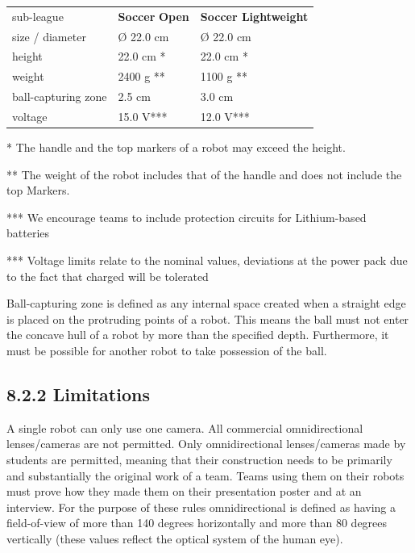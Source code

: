 \documentclass{article}
\begin{document}
\begin{table}
\begin{tabularx}{\textwidth}{
p{}
p{}
p{}}
sub-league & \textbf{Soccer} \textbf{Open} & \textbf{Soccer Lightweight} \\
size / diameter & \O{} 22.0 cm & \O{} 22.0 cm \\
height & 22.0 cm * & 22.0 cm * \\
weight & 2400 g ** & 1100 g ** \\
ball-capturing zone & 2.5 cm & 3.0 cm \\
voltage & 15.0 V\textcolor{color-5}{***} & 12.0 V\textcolor{color-5}{***} \\

\end{tabularx}

\end{table}

* The handle and the top markers of a robot may exceed the height.

** The weight of the robot includes that of the handle and does not include the top Markers.

*** We encourage teams to include protection circuits for Lithium-based batteries

*** Voltage limits relate to the nominal values, deviations at the power pack due to the fact that charged will be tolerated

Ball-capturing zone is defined as any internal space created when a straight edge is placed on the protruding points of a robot. This means the ball must not enter the concave hull of a robot by more than the specified depth. Furthermore, it must be possible for another robot to take possession of the ball.

\subsection{8.2.2 Limitations\label{ref-056}}

A single robot can only use one camera. All commercial omnidirectional lenses/cameras are not permitted. Only omnidirectional lenses/cameras made by students are permitted, meaning that their construction needs to be primarily and substantially the original work of a team. Teams using them on their robots must prove how they made them on their presentation poster and at an interview. For the purpose of these rules omnidirectional is defined as having a field-of-view of more than 140 degrees horizontally and more than 80 degrees vertically (these values reflect the optical system of the human eye).
\end{document}

